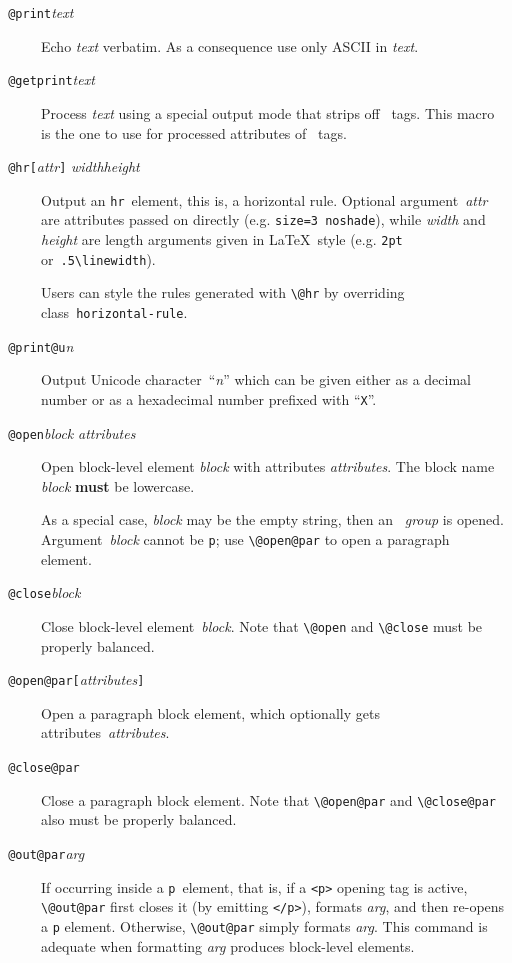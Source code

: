 \begin{description}
\item[{\tt{} @print}{\it text}{\tt{}}] Echo
  \textit{text} verbatim.  As a consequence use only ASCII in
  \textit{text}.

\item[{\tt{} @getprint}{\it text}{\tt{}}] Process
  \textit{text} using a special output mode that strips off
  \html~tags.  This macro is the one to use for processed attributes
  of \html~tags.

\item[{\tt{} @hr[}{\it attr}{\tt]}{\it
    width}{\tt{}}{\it height}{\tt{}}] Output an
  \verb+hr+~element, this is, a horizontal rule.  Optional
  argument~\textit{attr} are attributes passed on directly
  (e.g. \verb+size=3 noshade+), while \textit{width} and
  \textit{height} are length arguments given in \LaTeX~style
  (e.g. \verb+2pt+ or~\verb+.5\linewidth+).

  Users can style the rules generated with \verb+\@hr+ by overriding
  class~\verb+horizontal-rule+.

\item[{\tt{} @print@u}{\it n}{\tt{}}] Output
  Unicode character~``\textit{n}'' which can be given either as a
  decimal number or as a hexadecimal number prefixed with
  ``\texttt{X}''.

\item[{\tt{} @open}{\it block}{\tt{}}{\it
    attributes}{\tt{}}] Open \html{} block-level element
  \textit{block} with attributes \textit{attributes}.  The block name
  \textit{block} \textbf{must} be lowercase.

  As a special case, \textit{block} may be the empty string, then an
  \html~\emph{group} is opened.  Argument~\textit{block} cannot be
  \verb+p+; use \verb+\@open@par+ to open a paragraph element.

\item[{\tt{} @close}{\it block}{\tt{}}] Close
  \html{} block-level element~\textit{block}.  Note that \verb+\@open+
  and \verb+\@close+ must be properly balanced.

\item[{\tt{} @open@par[}{\it attributes}{\tt ]}] Open a paragraph
  block element, which optionally gets attributes~\textit{attributes}.

\item[{\tt{} @close@par}] Close a paragraph block element.  Note
  that \verb+\@open@par+ and \verb+\@close@par+ also must be properly
  balanced.

\item[{\tt{} @out@par}{\it arg}{\tt{}}] If
  occurring inside a \verb+p+~element, that is, if a \verb+<p>+
  opening tag is active, \verb+\@out@par+ first closes it (by emitting
  \verb+</p>+), formats \textit{arg}, and then re-opens a \verb+p+
  element.  Otherwise, \verb+\@out@par+ simply formats \textit{arg}.
  This command is adequate when formatting \textit{arg} produces
  block-level elements.
\end{description}

